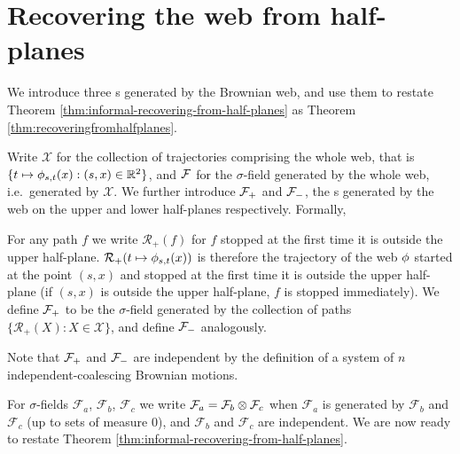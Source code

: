 \newcommand{\indepbm}{\psi}
\newcommand{\toinP}{\overset{\P}\to}
\newcommand{\statementoflemresampledetosampled}{$\resamplede \toinP \sampled$ as $\epsilon \to 0$}

\newcommand{\statewebO}{S_{\webnoargs}}
\newcommand{\statenowebO}{S_{\indepbm}}
\newcommand{\trajs}{\mathcal{X}}
\newcommand{\tensorcondition}{$\sigma$-fields $\F_a$, $\F_b$, $\F_c$
  we write $\F_a = \F_b \tensor \F_c$ when $\F_a$ is generated by
  $\F_b$ and $\F_c$ (up to sets of measure $0$), and $\F_b$ and $\F_c$
  are independent}
{
\section{Recovering the web from half-planes}
\label{sec:recovering-from-half-planes}

We introduce three \sigfield{}s generated by the Brownian web, and use
them to restate Theorem \ref{thm:informal-recovering-from-half-planes}
as Theorem \ref{thm:recoveringfromhalfplanes}.

\newcommand{\restrictupper}{\mathcal{R}_{+}}

  Write $\trajs$ for the collection of trajectories comprising the whole web,
  that is $\{t \mapsto \phi_{{s},{t}}(x) : (s,x) \in \mathbb{R}^2\}$,
  and $\mathcal{F}$ for the $\sigma$-field generated by the
  whole web, i.e.\ generated by $\trajs$.
  We further introduce $\mathcal{F}_{+}$ and $\mathcal{F}_{-}$, the \sigfield{}s
  generated by the web on the upper and lower half-planes
  respectively.  Formally,

  \begin{definition*}
  For any path $f$ we write $\restrictupper(f)$ for $f$ stopped at the
  first time it is outside the upper half-plane.
  $\restrictupper(t \mapsto \web{s}{t}{x})$ is therefore the trajectory of the
  web $\phi$ started at the point $(s,x)$ and stopped at the first
  time it is outside the upper half-plane (if $(s,x)$ is outside the
  upper half-plane, $f$ is stopped immediately).
  We define $\mathcal{F}_{+}$ to be the $\sigma$-field generated by the
  collection of paths $\{\restrictupper(X) : X \in \trajs \}$, and define $\mathcal{F}_{-}$ analogously.
  \end{definition*}

  Note that $\mathcal{F}_{+}$ and $\mathcal{F}_{-}$ are independent by the definition of
  a system of $n$ independent-coalescing Brownian motions.

  \newcommand{\F}{\mathcal{F}}
  For \tensorcondition{}.
  We are now ready to restate Theorem
  \ref{thm:informal-recovering-from-half-planes}.

}
